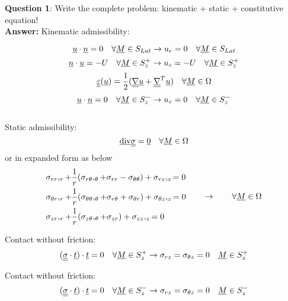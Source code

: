 \noindent \textbf{Question 1}: Write the complete problem: kinematic + static + constitutive equation! \\

\textbf{Answer:} Kinematic admissibility:

\begin{equation}
\underline{u} \cdot \underline{n} = 0 \quad \forall \underline{M} \in S_{Lat} \rightarrow u_r = 0 \quad \forall \underline{M} \in S_{Lat} 
\end{equation}
\begin{equation}
\underline{n} \cdot \underline{u}  = -U \quad \forall \underline{M} \in S_{z}^+ \rightarrow u_z = -U \quad \forall \underline{M} \in S_{z}^+ 
\end{equation}
\begin{equation}
\underline{\underline{\varepsilon}} (\underline{u}) = \frac{1}{2} ({\underline{\underline{\nabla}} \underline{u} + \underline{\underline{\nabla}}^T \underline{u} }) \quad \forall \underline{M} \in \Omega
\end{equation}
\begin{equation}
\underline{u} \cdot \underline{n} = 0 \quad \forall \underline{M} \in S_{z}^- \rightarrow u_z = 0 \quad \forall \underline{M} \in S_{z}^- 
\end{equation} \\

Static admissibility:
\begin{equation}
\text{\underline{div}} \underline{\underline{\sigma}} = \underline{0} \quad \forall \underline{M} \in \Omega 
\end{equation}
or in expanded form as below
\begin{equation}
\begin{split}
& \sigma_{rr} ,_r + \frac{1}{r} (\sigma_{r\theta},_\theta + \sigma_{rr} - \sigma_{\theta\theta}) + \sigma_{rz},_z = 0 \\
& \sigma_{\theta r} ,_r + \frac{1}{r} (\sigma_{\theta\theta},_\theta + \sigma_{r\theta} + \sigma_{\theta r}) + \sigma_{\theta z},_z = 0 \\
& \sigma_{zr} ,_r + \frac{1}{r} (\sigma_{z\theta},_\theta + \sigma_{zr} ) + \sigma_{zz},_z = 0
\end{split} \quad \quad  \rightarrow \quad \quad \forall \underline{M} \in \Omega 
\end{equation}

Contact without friction:
\begin{equation}
(\underline{\underline{\sigma}} \cdot \underline{t})\cdot \underline{t} = 0 \quad \forall \underline{M} \in S_z^+ \rightarrow \sigma_{rz} = \sigma_{\theta z} = 0 \quad \underline{M} \in S_z^+
\label{eq:szplus}
\end{equation}

Contact without friction:
\begin{equation}
(\underline{\underline{\sigma}} \cdot \underline{t})\cdot \underline{t} = 0 \quad \forall \underline{M} \in S_z^- \rightarrow \sigma_{rz} = \sigma_{\theta z} = 0 \quad \underline{M} \in S_z^-
\label{eq:szmin}
\end{equation}

